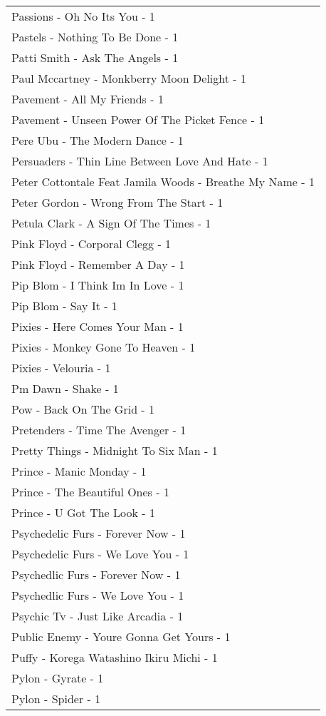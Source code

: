 \documentclass[
]{article}
\begin{document}
\begin{longtable}{l}
Passions - Oh No Its You - 1 \\ 
Pastels - Nothing To Be Done - 1 \\ 
Patti Smith - Ask The Angels - 1 \\ 
Paul Mccartney - Monkberry Moon Delight - 1 \\ 
Pavement - All My Friends - 1 \\ 
Pavement - Unseen Power Of The Picket Fence - 1 \\ 
Pere Ubu - The Modern Dance - 1 \\ 
Persuaders - Thin Line Between Love And Hate - 1 \\ 
Peter Cottontale Feat Jamila Woods - Breathe My Name - 1 \\ 
Peter Gordon - Wrong From The Start - 1 \\ 
Petula Clark - A Sign Of The Times - 1 \\ 
Pink Floyd - Corporal Clegg - 1 \\ 
Pink Floyd - Remember A Day - 1 \\ 
Pip Blom - I Think Im In Love - 1 \\ 
Pip Blom - Say It - 1 \\ 
Pixies - Here Comes Your Man - 1 \\ 
Pixies - Monkey Gone To Heaven - 1 \\ 
Pixies - Velouria - 1 \\ 
Pm Dawn - Shake - 1 \\ 
Pow - Back On The Grid - 1 \\ 
Pretenders - Time The Avenger - 1 \\ 
Pretty Things - Midnight To Six Man - 1 \\ 
Prince - Manic Monday - 1 \\ 
Prince - The Beautiful Ones - 1 \\ 
Prince - U Got The Look - 1 \\ 
Psychedelic Furs - Forever Now - 1 \\ 
Psychedelic Furs - We Love You - 1 \\ 
Psychedlic Furs - Forever Now - 1 \\ 
Psychedlic Furs - We Love You - 1 \\ 
Psychic Tv - Just Like Arcadia - 1 \\ 
Public Enemy - Youre Gonna Get Yours - 1 \\ 
Puffy - Korega Watashino Ikiru Michi - 1 \\ 
Pylon - Gyrate - 1 \\ 
Pylon - Spider - 1 \\ 

\end{longtable}
\end{document}
